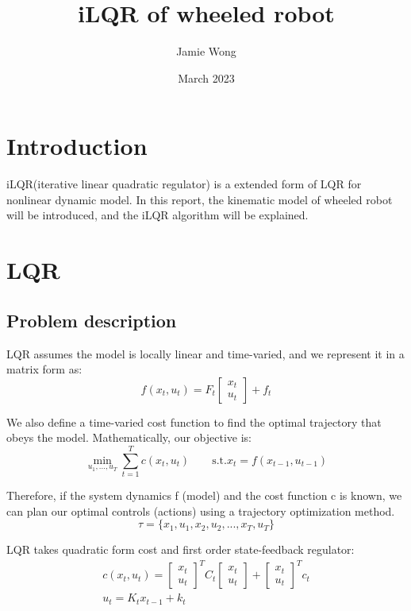 \documentclass{article}
\title{iLQR of wheeled robot}
\author{Jamie Wong}
\date{March 2023}
\begin{document}
\maketitle

\section{Introduction}
iLQR(iterative linear quadratic regulator) is a extended form of LQR for nonlinear dynamic model. In this report, the kinematic model of wheeled robot will be introduced, and the iLQR algorithm will be explained.

\section{LQR}
\subsection{Problem description}
LQR assumes the model is locally linear and time-varied, and we represent it in a matrix form as:
\[
f(x_t,u_t)=F_t\begin{bmatrix} x_t\\u_t \end{bmatrix} + f_t
\]

We also define a time-varied cost function to find the optimal trajectory that obeys the model. Mathematically, our objective is:
\begin{equation}
    \min_{u_1,...,u_T}\sum_{t=1}^T{c(x_t,u_t)} \qquad \text{s.t.} x_t = f(x_{t-1},u_{t-1}) \label{optimal-control}
\end{equation}

Therefore, if the system dynamics f (model) and the cost function c is known, we can plan our optimal controls (actions) using a trajectory optimization method.
\[
\tau = \{x_1,u_1,x_2,u_2,...,x_T,u_T\}
\]

LQR takes quadratic form cost and first order state-feedback regulator:
\begin{gather}
    c(x_t,u_t)=\begin{bmatrix}
        x_t\\u_t
    \end{bmatrix}^T C_t \begin{bmatrix}
        x_t\\u_t
    \end{bmatrix}
    + \begin{bmatrix}
        x_t\\u_t
    \end{bmatrix}^T c_t\\
    u_t = K_t x_{t-1} + k_t
\end{gather}
\end{document}
